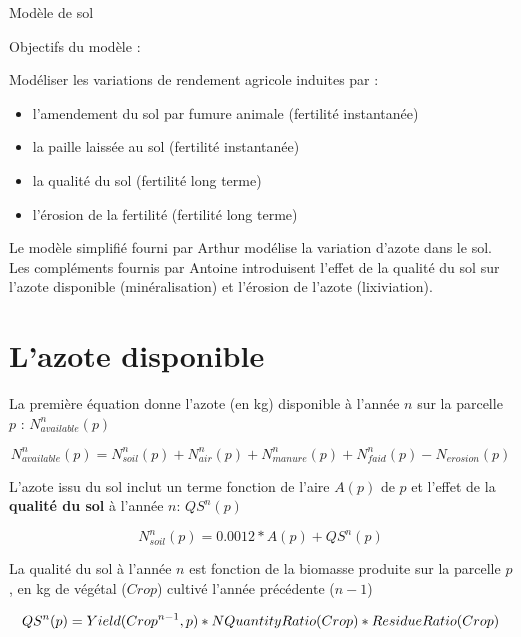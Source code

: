 \documentclass[10pt,a4paper,french]{article} %
\begin{document}
Modèle de sol 

Objectifs du modèle :


Modéliser les variations de rendement agricole induites par : 

\begin{itemize}
	\item l'amendement du sol par fumure animale  (fertilité instantanée)
	\item la paille laissée au sol (fertilité instantanée)
	\item la qualité du sol (fertilité long terme)
	\item l'érosion de la fertilité (fertilité long terme)
\end{itemize} 

\vspace{0.5cm}
Le modèle simplifié fourni par Arthur modélise la variation d'azote dans le sol. 
Les compléments fournis par Antoine introduisent l'effet de la qualité du sol sur l'azote disponible (minéralisation) et l'érosion de l'azote (lixiviation). 



\section{L'azote disponible}



La première équation donne l'azote (en kg) disponible à l'année $n$ sur la parcelle $p$ : $N_{available}^{n}(p)$

\begin{equation}
N_{available}^{n}(p)=N_{soil}^{n}(p)+N_{air}^{n}(p)+N_{manure}^{n}(p)+N_{faid}^{n}(p)-N_{erosion}(p)
\end{equation}


L'azote issu du sol inclut  un terme fonction de l'aire $A(p)$ de $p$ et l'effet de la \textbf{qualité du sol} à l'année $n$:  $QS^{n}(p)$

\begin{equation}
N_{soil}^{n}(p) = 0.0012 * A(p) + QS^{n}(p)
\end{equation}


La qualité du sol à l'année $n$ est fonction de la biomasse produite sur la parcelle $p$ , en kg de végétal ($Crop$) cultivé l'année précédente ($n-1$)


\begin{equation}
QS^{n}(p) = Yield(Crop^{n-1},p) * NQuantityRatio(Crop) * ResidueRatio(Crop) \\
\end{equation}
\end{document}
